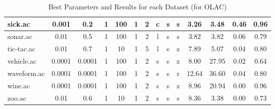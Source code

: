 \begin{table}[htbp]
\begin{tabular}{|l|c|c|c|c|c|c|c|c|c||c|c|c|c|}
		\hline
		sick.ac        & 0.001    & 0.2         & 1              & 100                 & 1             & 2             & c      & s        & s        & 3.26           & 3.48           & 0.46           & 0.96           \\
		\hline
		sonar.ac       & 0.01     & 0.5         & 1              & 100                 & 1             & 2             & l      & s        & s        & 3.82           & 3.82           & 0.06           & 0.79           \\
		\hline
		tic-tac.ac     & 0.01     & 0.7         & 1              & 10                  & 1             & 5             & l      & s        & z        & 7.89           & 5.07           & 0.04           & 0.80           \\
		\hline
		vehicle.ac     & 0.0001   & 0.0001      & 1              & 100                 & 1             & 2             & s      & s        & z        & 8.00           & 27.95          & 0.02           & 0.64           \\
		\hline
		waveform.ac    & 0.0001   & 0.0001      & 1              & 100                 & 1             & 2             & s      & s        & r        & 12.64          & 36.60          & 0.04           & 0.80           \\
		\hline
		wine.ac        & 0.0001   & 0.0001      & 1              & 100                 & 1             & 2             & s      & s        & z        & 8.96           & 20.94          & 0.00           & 0.96           \\
		\hline
		zoo.ac         & 0.01     & 0.6         & 1              & 10                  & 1             & 2             & s      & s        & s        & 8.36           & 3.38           & 0.00           & 0.73           \\
		\hline
		\end{tabular}
	\caption{Best Parameters and Results for each Dataset (for OLAC)}
	\label{tab:best_runs_for_each_db_olac}
\end{table}
